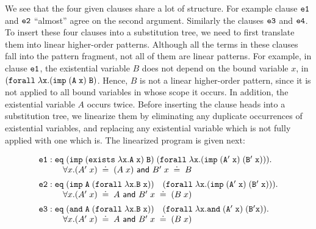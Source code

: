 \documentclass{llncs}
\newcommand{\typeLF}{\tt{type}}
\newcommand{\propLF}{\tt{prop}}
\newcommand{\andLF}{\tt{and}\;}
\newcommand{\impLF}{\tt{imp}\;}
\newcommand{\forallLF}{\tt{forall}\;}
\newcommand{\existsLF}{\tt{exists}\;}
\newcommand{\eqLF}{\tt{eq}\;}
\newcommand{\eqilLF}{\tt{e1}}
\newcommand{\eqirLF}{\tt{e2}}
\newcommand{\eqalLF}{\tt{e3}}
\newcommand{\eqarLF}{\tt{e4}}
\newcommand{\unif}{\;\doteq\;}
\begin{document}
We see that the four given clauses share a lot of structure. For
example clause $\eqilLF$ and $\eqirLF$ ``almost'' agree on the second
argument. Similarly the clauses $\eqalLF$ and $\eqarLF$. To insert
these four clauses into a substitution tree, we need to first
translate them into linear higher-order patterns. Although all the
terms in these clauses fall into the pattern fragment, not all of them
are linear patterns.
For example, in clause $\eqilLF$, 
%
the existential variable $B$ does not depend on the bound variable
$x$, in $(\forallLF \lambda x. (\impLF (A\; x)\; B)$. Hence, $B$ is
not a linear higher-order pattern, since it is not applied to all
bound variables in whose scope it occurs. In addition, the existential
variable $A$ occurs twice. Before inserting the clause heads into a
substitution tree, we linearize them by eliminating any duplicate
occurrences of existential variables, and replacing any existential
variable which is not fully applied with one which is. The linearized
program  is given next:


\begin{small}
\[
\begin{array}{ll}
%
\eqilLF: \eqLF (\impLF (\existsLF \lambda x. A\; x)\; B)\;
                 (\forallLF \lambda x. (\impLF (A'\; x)\; (B'\;x))). \\
\hspace{1cm}\forall x. (A'\; x) \unif (A \; x) {\textsf{ and } } B'\;x   \unif B\\[0.5em]
\eqirLF: \eqLF (\impLF A\; (\forallLF \lambda x. B\;x))\quad
                 (\forallLF \lambda x. (\impLF (A'\;x) \; (B'\; x))).\\
\hspace{1cm} \forall x. (A'\; x) \unif A  {\textsf{ and }} B'\;x   \unif (B\;x)\\[0.5em]
\eqalLF: \eqLF (\andLF A \; (\forallLF \lambda x. B\; x)) \quad
                 (\forallLF \lambda x. \andLF (A'\;x) \; (B' x)).\\
\hspace{1cm} \forall x. (A'\; x) \unif A  {\textsf{ and }} B'\;x   \unif (B\;x)\\[0.5em]
\end{array}
\]
\end{small}
\end{document}
